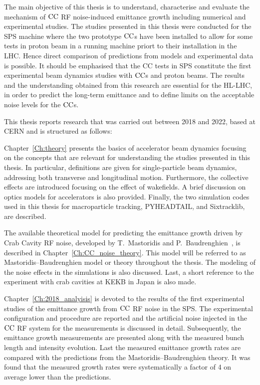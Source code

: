 The main objective of this thesis is to understand, characterise and evaluate the mechanism of ${\mathrm{CC}}$ RF noise-induced emittance growth including numerical and experimental studies. The studies presented in this thesis were conducted for the SPS machine where the two prototype ${\mathrm{CC}}$s have been installed to allow for some tests in proton beam in a running machine priort to their installation in the LHC. Hence direct comparison of predictions from models and experimental data is possible. 
It should be emphasised that the CC tests in SPS constitute the first experimental beam dynamics studies with ${\mathrm{CC}}$s and proton beams. The results and the understanding obtained from this research are essential for the HL-LHC, in order to predict the long-term emittance and to define limits on the acceptable noise levels for the ${\mathrm{CC}}$s.

This thesis reports research that was carried out between 2018 and 2022, based at CERN and is structured as follows:

Chapter~\ref{Ch:theory} presents the basics of accelerator beam dynamics focusing on the concepts that are relevant for understanding the studies presented in this thesis. In particular, definitions are given for single-particle beam dynamics, addressing both transverse and longitudinal motion. Furthermore, the collective effects are introduced focusing on the effect of wakefields. A brief discussion on optics models for accelerators is also provided. Finally, the two simulation codes used in this thesis for macroparticle tracking, PYHEADTAIL, and Sixtracklib, are described.

The available theoretical model for predicting the emittance growth driven by Crab Cavity RF noise, developed by T.~Mastoridis and P.~Baudrenghien~\cite{PhysRevSTAB.18.101001}, is described in Chapter~\ref{Ch:CC_noise_theory}. This model will be referred to as Mastoridis--Baudrenghien model or theory throughout the thesis. The modeling of the noise effects in the simulations is also discussed. Last, a short reference to the experiment with crab cavities at KEKB in Japan is also made. 

Chapter~\ref{Ch:2018_analyisis} is devoted to the results of the first experimental studies of the emittance growth from ${\mathrm{CC}}$ RF noise in the SPS. The experimental configuration and procedure are reported and the artificial noise injected in the ${\mathrm{CC}}$ RF system for the measurements is discussed in detail. Subsequently, the emittance growth measurements are presented along with the measured bunch length and intensity evolution. Last the measured emittance growth rates are compared with the predictions from the Mastoridis--Baudrenghien theory. It was found that the measured growth rates were systematically a factor of 4 on average lower than the predictions. 

